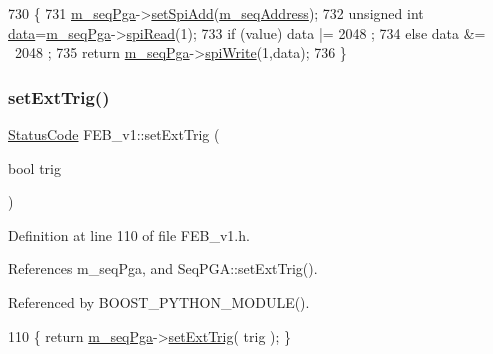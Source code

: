 \begin{DoxyCode}
730                                                  \{
731   \hyperlink{classFEB__v1_a6c7804ac86796f233a8393043adf2e77}{m\_seqPga}->\hyperlink{classSeqPGA_ac998ce3a6d9b5f2e88cc8393f8c1df53}{setSpiAdd}(\hyperlink{classFEB__v1_a1c1eb093fd1733b9510fcf8bc5c7ad08}{m\_seqAddress});
732   \textcolor{keywordtype}{unsigned} \textcolor{keywordtype}{int} \hyperlink{classFEB__v1_a6bca4320bd3bbbc32efc81097f33421a}{data}=\hyperlink{classFEB__v1_a6c7804ac86796f233a8393043adf2e77}{m\_seqPga}->\hyperlink{classSeqPGA_ab3d0e5e5d4014bc7a92588a76b8713d4}{spiRead}(1);
733   \textcolor{keywordflow}{if} (value) data |=  2048 ;
734   \textcolor{keywordflow}{else}       data &= ~2048 ;
735   \textcolor{keywordflow}{return} \hyperlink{classFEB__v1_a6c7804ac86796f233a8393043adf2e77}{m\_seqPga}->\hyperlink{classSeqPGA_ad4421841ce4ce8b88ad13f63216f0743}{spiWrite}(1,data);
736 \}
\end{DoxyCode}
\mbox{\label{classFEB__v1_aea3b1f84ea9be2e5c55a93ae215c8a35}} 
\subsubsection{\texorpdfstring{set\+Ext\+Trig()}{setExtTrig()}}
{\footnotesize\ttfamily \hyperlink{classStatusCode}{Status\+Code} F\+E\+B\+\_\+v1\+::set\+Ext\+Trig (\begin{DoxyParamCaption}\item[{bool}]{trig }\end{DoxyParamCaption})\hspace{0.3cm}{\ttfamily [inline]}}



Definition at line 110 of file F\+E\+B\+\_\+v1.\+h.



References m\+\_\+seq\+Pga, and Seq\+P\+G\+A\+::set\+Ext\+Trig().



Referenced by B\+O\+O\+S\+T\+\_\+\+P\+Y\+T\+H\+O\+N\+\_\+\+M\+O\+D\+U\+L\+E().


\begin{DoxyCode}
110 \{ \textcolor{keywordflow}{return} \hyperlink{classFEB__v1_a6c7804ac86796f233a8393043adf2e77}{m\_seqPga}->\hyperlink{classSeqPGA_a9744b6cff04738474556cc2153af19de}{setExtTrig}( trig ); \}
\end{DoxyCode}
\mbox{\label{classFEB__v1_ac30cac86837c86e4f03cb51fff6226cd}} 
